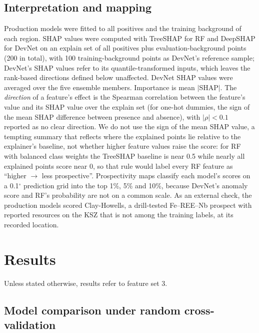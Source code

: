 \documentclass[pdflatex,sn-apa]{sn-jnl}
\begin{document}
\subsection{Interpretation and mapping}\label{sec:shap}

Production models were fitted to all positives and the training background of each region. SHAP values \citep{Lundberg2017} were computed with TreeSHAP for RF \citep{Lundberg2020} and DeepSHAP for DevNet on an explain set of all positives plus evaluation-background points (200 in total), with 100 training-background points as DevNet's reference sample; DevNet's SHAP values refer to its quantile-transformed inputs, which leaves the rank-based directions defined below unaffected. DevNet SHAP values were averaged over the five ensemble members. Importance is mean $|$SHAP$|$. The \emph{direction} of a feature's effect is the Spearman correlation between the feature's value and its SHAP value over the explain set (for one-hot dummies, the sign of the mean SHAP difference between presence and absence), with $|\rho| < 0.1$ reported as no clear direction. We do not use the sign of the mean SHAP value, a tempting summary that reflects where the explained points lie relative to the explainer's baseline, not whether higher feature values raise the score: for RF with balanced class weights the TreeSHAP baseline is near 0.5 while nearly all explained points score near 0, so that rule would label every RF feature as ``higher $\rightarrow$ less prospective''. Prospectivity maps classify each model's scores on a 0.1$^\circ$ prediction grid into the top 1\%, 5\% and 10\%, because DevNet's anomaly score and RF's probability are not on a common scale. As an external check, the production models scored Clay-Howells, a drill-tested Fe--REE--Nb prospect with reported resources on the KSZ \citep{OGS2011} that is not among the training labels, at its recorded location.

\section{Results}\label{sec:results}

Unless stated otherwise, results refer to feature set 3.

\subsection{Model comparison under random cross-validation}\label{sec:res-random}
\end{document}
